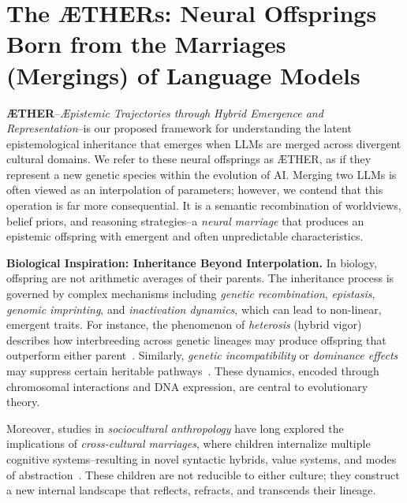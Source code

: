 

\section{The \AE{}THERs: Neural Offsprings Born from the Marriages (Mergings) of Language Models}

\textbf{\AE{}THER}--\textit{\AE{}pistemic Trajectories through Hybrid Emergence and Representation}--is our proposed framework for understanding the latent epistemological inheritance that emerges when LLMs are merged across divergent cultural domains. We refer to these neural offsprings as \AE{}THER, as if they represent a new genetic species within the evolution of AI. Merging two LLMs is often viewed as an interpolation of parameters; however, we contend that this operation is far more consequential. It is a semantic recombination of worldviews, belief priors, and reasoning strategies--a \emph{neural marriage} that produces an epistemic offspring with emergent and often unpredictable characteristics. 

\vspace{0.8em}
\noindent\textbf{Biological Inspiration: Inheritance Beyond Interpolation.}
In biology, offspring are not arithmetic averages of their parents. The inheritance process is governed by complex mechanisms including \emph{genetic recombination}, \emph{epistasis}, \emph{genomic imprinting}, and \emph{inactivation dynamics}, which can lead to non-linear, emergent traits. For instance, the phenomenon of \emph{heterosis} (hybrid vigor) describes how interbreeding across genetic lineages may produce offspring that outperform either parent~\citep{gavrilets2003models}. Similarly, \emph{genetic incompatibility} or \emph{dominance effects} may suppress certain heritable pathways~\citep{barron2022hybridization}. These dynamics, encoded through chromosomal interactions and DNA expression, are central to evolutionary theory.

Moreover, studies in \emph{sociocultural anthropology} have long explored the implications of \emph{cross-cultural marriages}, where children internalize multiple cognitive systems--resulting in novel syntactic hybrids, value systems, and modes of abstraction~\citep{mcdermott2001crosscultural, appadurai1996modernity}. These children are not reducible to either culture; they construct a new internal landscape that reflects, refracts, and transcends their lineage.

